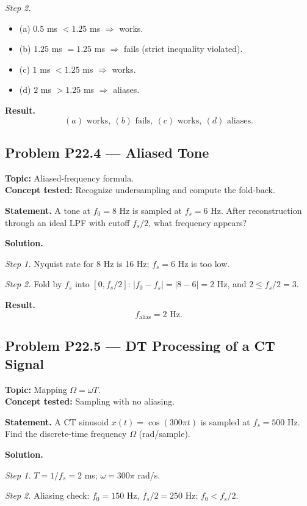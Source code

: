 \documentclass[11pt]{article}
\begin{document}
\textit{Step 2.}
\begin{itemize}
\item (a) $0.5$ ms $<1.25$ ms $\Rightarrow$ works.
\item (b) $1.25$ ms $=1.25$ ms $\Rightarrow$ fails (strict inequality violated).
\item (c) $1$ ms $<1.25$ ms $\Rightarrow$ works.
\item (d) $2$ ms $>1.25$ ms $\Rightarrow$ aliases.
\end{itemize}

\textbf{Result.}
\[
\boxed{\,(a)\text{ works},\ (b)\text{ fails},\ (c)\text{ works},\ (d)\text{ aliases.}\,}
\]

\subsection{Problem P22.4 --- Aliased Tone}
\textbf{Topic:} Aliased-frequency formula.\\
\textbf{Concept tested:} Recognize undersampling and compute the fold-back.

\textbf{Statement.} A tone at $f_{0}=8$ Hz is sampled at $f_{s}=6$ Hz. After
reconstruction through an ideal LPF with cutoff $f_{s}/2$, what frequency
appears?

\textbf{Solution.}

\textit{Step 1.} Nyquist rate for 8 Hz is 16 Hz; $f_{s}=6$ Hz is too low.

\textit{Step 2.} Fold by $f_{s}$ into $[0,f_{s}/2]$: $|f_{0}-f_{s}| = |8-6| = 2$ Hz,
and $2\le f_{s}/2 = 3$. \checkmark

\textbf{Result.}
\[
\boxed{\,f_{\text{alias}} = 2\text{ Hz}.\,}
\]

\subsection{Problem P22.5 --- DT Processing of a CT Signal}
\textbf{Topic:} Mapping $\Omega = \omega T$.\\
\textbf{Concept tested:} Sampling with no aliasing.

\textbf{Statement.} A CT sinusoid $x(t) = \cos(300\pi t)$ is sampled at
$f_{s}=500$ Hz. Find the discrete-time frequency $\Omega$ (rad/sample).

\textbf{Solution.}

\textit{Step 1.} $T = 1/f_{s} = 2$ ms; $\omega = 300\pi$ rad/s.

\textit{Step 2.} Aliasing check: $f_{0}=150$ Hz, $f_{s}/2=250$ Hz; $f_{0}<f_{s}/2$. \checkmark
\end{document}
